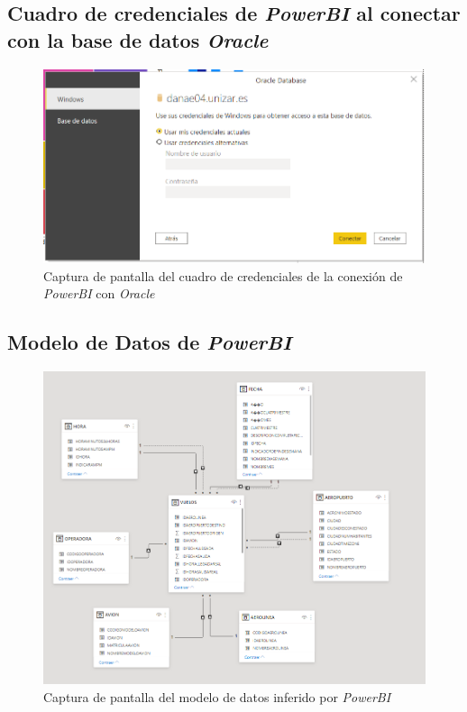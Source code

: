 \documentclass{article}
\begin{document}
\subsection{Cuadro de credenciales de \textit{PowerBI} al conectar con la base de datos \textit{Oracle}}

\begin{figure}[h!]
    \centering
    \includegraphics[scale=0.8]{images/cuadroConexionCredenciales.png}
    \caption{Captura de pantalla del cuadro de credenciales de la conexión de \textit{PowerBI} con \textit{Oracle}}
    \label{fig:cuadroConexionCredenciales}
\end{figure}

\newpage
\subsection{Modelo de Datos de \textit{PowerBI}}

\begin{figure}[h!]
    \centering
    \includegraphics[scale=0.8]{images/modeloDatosPowerBI.png}
    \caption{Captura de pantalla del modelo de datos inferido por \textit{PowerBI}}
    \label{fig:modeloDatos}
\end{figure}



\newpage
{}


\end{document}
